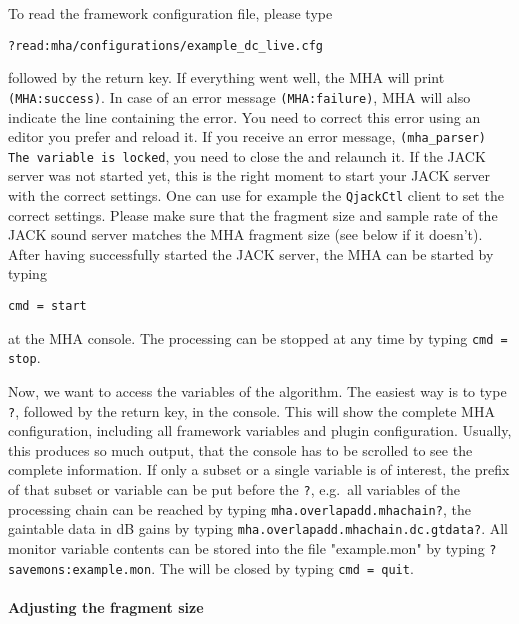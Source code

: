 To read the framework configuration file, please type
\begin{verbatim}
?read:mha/configurations/example_dc_live.cfg
\end{verbatim}
followed by the return key. If everything went well, the MHA will print
\verb!(MHA:success)!. In case of an error message \verb!(MHA:failure)!, MHA 
will also indicate the line containing the error. You need to correct this 
error using an editor you prefer and  reload it. If you receive an error 
message, \verb!(mha_parser) The variable is locked!, you need to close the 
\mhad{} and relaunch it. If the JACK server was not started yet, this is the
right moment to start your JACK server with the correct settings. One can use 
for example the \verb!QjackCtl! client to set the correct settings.
Please make sure that the fragment size and sample rate of the JACK
sound server matches the MHA fragment size (see below if it
doesn't). After having successfully started the JACK server, the MHA
can be started by typing
\begin{verbatim}
cmd = start
\end{verbatim}
at the MHA console. The processing can be stopped at any time by
typing \verb!cmd = stop!.

Now, we want to access the variables of the algorithm. The easiest way
is to type \verb!?!, followed by the return key, in the console. This
will show the complete MHA configuration, including all framework
variables and plugin configuration. Usually, this
produces so much output, that the console has to be scrolled to see
the complete information. If only a subset or a single variable is of
interest, the prefix of that subset or variable can be put before the
\verb!?!, e.g.\ all variables of the processing chain can be reached
by typing \newline\verb!mha.overlapadd.mhachain?!, the gaintable data in dB gains
by typing \newline\verb!mha.overlapadd.mhachain.dc.gtdata?!. All monitor variable contents can
be stored into the file "example.mon" by typing
\verb!?savemons:example.mon!. The \mhad{} will be closed
by typing \verb!cmd = quit!.

\paragraph{Adjusting the fragment size}%
%
%


